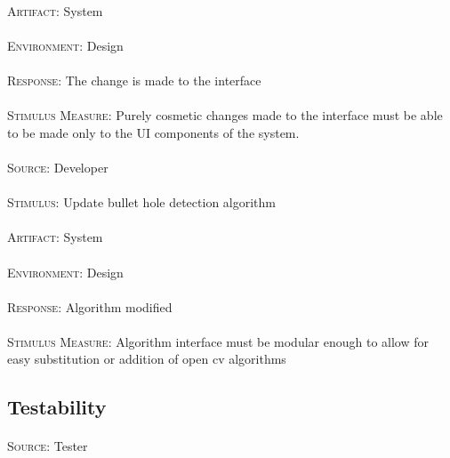 \paragraph{}\textsc{Artifact:} System
\paragraph{}\textsc{Environment:} Design
\paragraph{}\textsc{Response:} The change is made to the interface
\paragraph{}\textsc{Stimulus Measure:} Purely cosmetic changes made to the interface must be able to be made only to the UI components of the system.

\paragraph{}\textsc{Source:} Developer
\paragraph{}\textsc{Stimulus:} Update bullet hole detection algorithm
\paragraph{}\textsc{Artifact:} System
\paragraph{}\textsc{Environment:} Design
\paragraph{}\textsc{Response:} Algorithm modified
\paragraph{}\textsc{Stimulus Measure:} Algorithm interface must be modular enough to allow for easy substitution or addition of open cv algorithms

\subsection{Testability}
\paragraph{}\textsc{Source:} Tester

